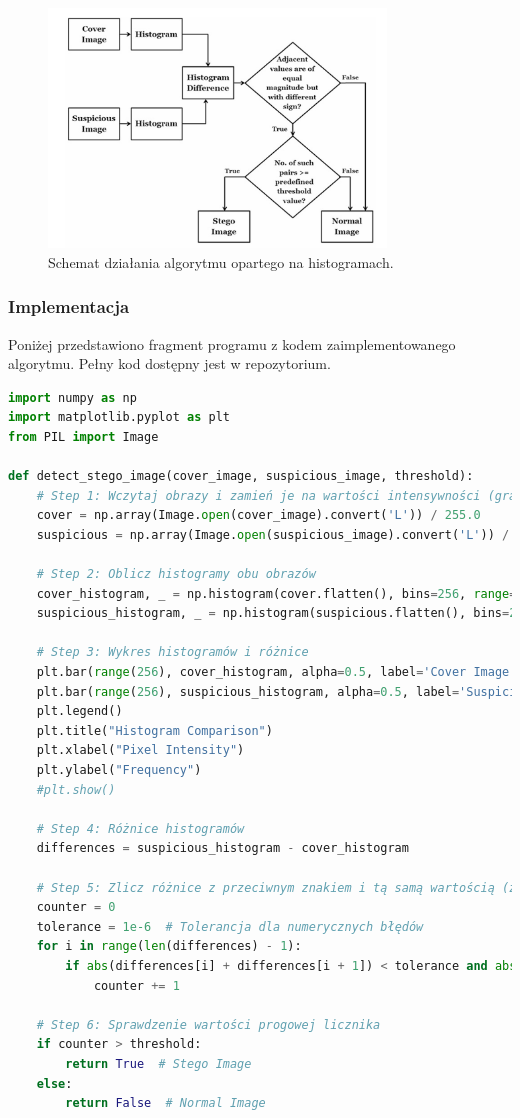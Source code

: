 \begin{figure}[h!]
    \centering
    \includegraphics[width=0.8\textwidth]{./img/hist_algorythm.png}
    \caption{Schemat działania algorytmu opartego na histogramach.}
    \label{fig:histogram_algorithm}
\end{figure}
    

\subsubsection{Implementacja}
Poniżej przedstawiono fragment programu z kodem zaimplementowanego algorytmu. Pełny kod dostępny jest w 
repozytorium.

\begin{lstlisting}[language=Python, caption=Steganaliza oparta na histogramach w Pythonie]
import numpy as np
import matplotlib.pyplot as plt
from PIL import Image

def detect_stego_image(cover_image, suspicious_image, threshold):
    # Step 1: Wczytaj obrazy i zamień je na wartości intensywności (grayscale)
    cover = np.array(Image.open(cover_image).convert('L')) / 255.0
    suspicious = np.array(Image.open(suspicious_image).convert('L')) / 255.0

    # Step 2: Oblicz histogramy obu obrazów
    cover_histogram, _ = np.histogram(cover.flatten(), bins=256, range=(0, 1))
    suspicious_histogram, _ = np.histogram(suspicious.flatten(), bins=256, range=(0, 1))

    # Step 3: Wykres histogramów i różnice
    plt.bar(range(256), cover_histogram, alpha=0.5, label='Cover Image Histogram')
    plt.bar(range(256), suspicious_histogram, alpha=0.5, label='Suspicious Image Histogram')
    plt.legend()
    plt.title("Histogram Comparison")
    plt.xlabel("Pixel Intensity")
    plt.ylabel("Frequency")
    #plt.show()

    # Step 4: Różnice histogramów
    differences = suspicious_histogram - cover_histogram

    # Step 5: Zlicz różnice z przeciwnym znakiem i tą samą wartością (z tolerancją)
    counter = 0
    tolerance = 1e-6  # Tolerancja dla numerycznych błędów
    for i in range(len(differences) - 1):
        if abs(differences[i] + differences[i + 1]) < tolerance and abs(differences[i]) > 0:
            counter += 1

    # Step 6: Sprawdzenie wartości progowej licznika
    if counter > threshold:
        return True  # Stego Image
    else:
        return False  # Normal Image
\end{lstlisting}

